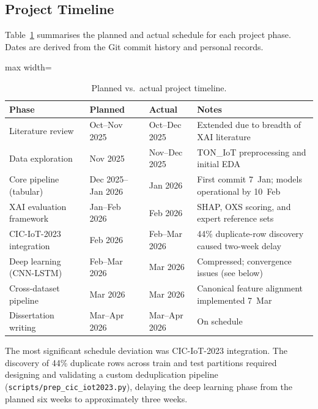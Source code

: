 \documentclass[12pt,a4paper]{report}
\begin{document}
\subsection*{Project Timeline}

Table~\ref{tab:project-timeline} summarises the planned and actual schedule for each project phase. Dates are derived from the Git commit history and personal records.

\begin{table}[htbp]
\centering
\caption{Planned vs.\ actual project timeline.}
\label{tab:project-timeline}
\small
\begin{adjustbox}{max width=\textwidth}
\begin{tabular}{p{3.8cm} p{2.5cm} p{2.5cm} p{4.5cm}}
\toprule
\textbf{Phase} & \textbf{Planned} & \textbf{Actual} & \textbf{Notes} \\
\midrule
Literature review        & Oct--Nov 2025 & Oct--Dec 2025 & Extended due to breadth of XAI literature \\
Data exploration         & Nov 2025      & Nov--Dec 2025 & TON\_IoT preprocessing and initial EDA \\
Core pipeline (tabular)  & Dec 2025--Jan 2026 & Jan 2026 & First commit 7~Jan; models operational by 10~Feb \\
XAI evaluation framework & Jan--Feb 2026 & Feb 2026 & SHAP, OXS scoring, and expert reference sets \\
CIC-IoT-2023 integration & Feb 2026      & Feb--Mar 2026 & 44\% duplicate-row discovery caused two-week delay \\
Deep learning (CNN-LSTM) & Feb--Mar 2026 & Mar 2026      & Compressed; convergence issues (see below) \\
Cross-dataset pipeline   & Mar 2026      & Mar 2026      & Canonical feature alignment implemented 7~Mar \\
Dissertation writing     & Mar--Apr 2026 & Mar--Apr 2026 & On schedule \\
\bottomrule
\end{tabular}
\end{adjustbox}
\end{table}

The most significant schedule deviation was CIC-IoT-2023 integration. The discovery of 44\% duplicate rows across train and test partitions required designing and validating a custom deduplication pipeline (\texttt{scripts/prep\_cic\_iot2023.py}), delaying the deep learning phase from the planned six weeks to approximately three weeks.
\end{document}
